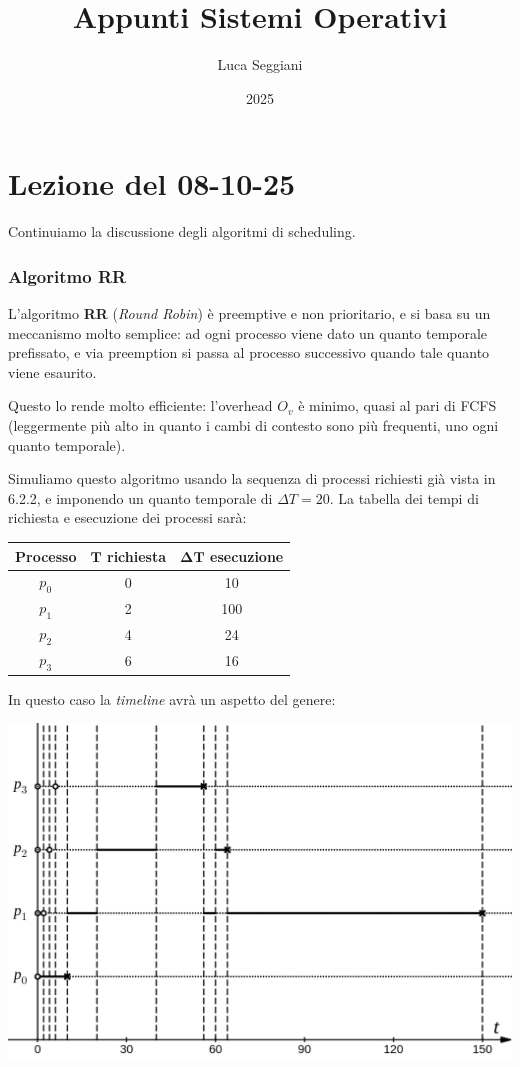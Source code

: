 \documentclass[a4paper,11pt]{article}
\title{Appunti Sistemi Operativi}
\author{Luca Seggiani}
\date{2025}
\begin{document}
\section{Lezione del 08-10-25}

\thispagestyle{empty}
\pagestyle{fancy}

Continuiamo la discussione degli algoritmi di scheduling.

\subsubsection{Algoritmo RR}
L'algoritmo \textbf{RR} (\textit{Round Robin}) è preemptive e non prioritario, e si basa su un meccanismo molto semplice: ad ogni processo viene dato un quanto temporale prefissato, e via preemption si passa al processo successivo quando tale quanto viene esaurito.

Questo lo rende molto efficiente: l'overhead $O_v$ è minimo, quasi al pari di FCFS (leggermente più alto in quanto i cambi di contesto sono più frequenti, uno ogni quanto temporale). 
\par\smallskip

Simuliamo questo algoritmo usando la sequenza di processi richiesti già vista in 6.2.2, e imponendo un quanto temporale di $\Delta T = 20$. La tabella dei tempi di richiesta e esecuzione dei processi sarà:
\begin{table}[H]
	\center {}
	\begin{tabular} { c || c | c }
		\bfseries Processo & \bfseries $\mathbf{T}$ richiesta & \bfseries $\mathbf{\Delta T}$ esecuzione \\
		\hline
		$p_0$ & 0 & 10 \\ 
		$p_1$ & 2 & 100 \\ 
		$p_2$ & 4 & 24 \\ 
		$p_3$ & 6 & 16 
	\end{tabular}
\end{table}

\newpage

In questo caso la \textit{timeline} avrà un aspetto del genere:
\begin{center}
	\includegraphics[scale=0.3]{../figures/rr.png}
\end{center}
\end{document}
